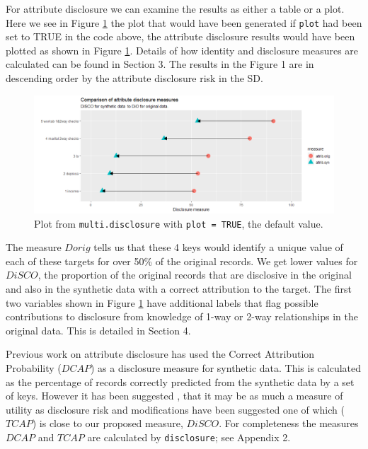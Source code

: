 \documentclass[12pt]{article}
\begin{document}
For attribute disclosure we can examine the results as either a table or a plot. Here we see in Figure \ref{fig:f1} the plot that would have been generated if \texttt{plot} had been set to TRUE in the code above, the attribute disclosure results would have been plotted as shown in Figure \ref{fig:f1}. Details of how identity and disclosure measures are calculated can be found in Section 3. The results in the Figure 1 are in descending order by the attribute disclosure risk in the SD.

\begin{figure}[ht]
  \centering
  \includegraphics[width=1\linewidth]{fig1dis.png}
  \caption{Plot from \texttt{multi.disclosure} with \texttt{plot = TRUE}, the default value.}
  \label{fig:f1}
\end{figure}


The measure $Dorig$ tells us that these 4 keys would identify a unique value of each of these targets for over 50\% of the original records. We get lower values for $DiSCO$, the proportion of the original records that are disclosive in the original and also in the synthetic data with a correct attribution to the target. The first two variables shown in Figure \ref{fig:f1} have additional labels that 
flag possible contributions to disclosure from knowledge of 1-way or 2-way relationships in the original data. This is detailed in Section 4. 

Previous work on attribute disclosure \cite{elliot2014SYLLS,taub_PSD2018} has used the Correct Attribution Probability ($DCAP$) as a disclosure measure for synthetic data. This is calculated as the percentage of records correctly predicted from the synthetic data by a set of keys.  However it has been suggested \cite{ChenUNECE2019}, that it may be as much a measure of utility as disclosure risk and modifications have been suggested \cite{taubUNECE2019,little2022} one of which ($TCAP$) is close to our proposed measure, $DiSCO$. For completeness the measures $DCAP$ and $TCAP$ are calculated by \texttt{disclosure}; see Appendix 2.
\end{document}
